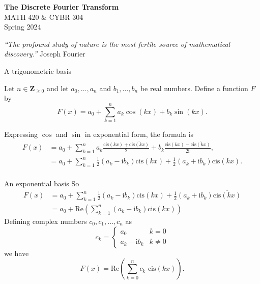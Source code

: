 \documentclass[portrait,fleqn,12pt]{beamer}
\newcommand{\integers}{\mathbf{Z}}
\newcommand{\cis}{\mathrm{cis}}
\newcommand{\imag}{\mathrm{i}}
\newcommand{\re}{\mathrm{Re}}
\begin{document}
\begin{frame}
\begin{flushleft} 
\textbf{The Discrete Fourier Transform} \\
MATH 420 \& CYBR 304 \\
Spring 2024 
\end{flushleft}

\emph{“The profound study of nature is the most fertile source of mathematical discovery.”} \hfill{\sc  Joseph Fourier}

\end{frame}


\begin{frame}{A trigonometric basis}  


Let $n \in \integers_{\geq 0}$ and let $a_0, \dots, a_n$ and $b_1, \dots, b_n$ be real numbers.  Define a function $F$ by 
\begin{equation*}
F(x) = a_0 + \sum_{k=1}^n a_k \cos(k x) +  b_k \sin(k x).
\end{equation*}

Expressing $\cos$ and $\sin$ in exponential form, the formula is 
\begin{align*}
F(x) &= a_0 + \sum_{k=1}^n a_k  \frac{\cis(k x) +  \overline{\cis(k x)}}{2} + b_k  \frac{\cis(k x) -  \overline{\cis(k x)}}{2 \imag}, \\
       & = a_0 + \sum_{k=1}^n \frac{1}{2} (a_k  - \imag b_k) \cis(k x) +   \frac{1}{2} (a_k  + \imag b_k) \overline{\cis(k x) } .  \\
\end{align*}
\end{frame}

\begin{frame}{An exponential basis}
So
\begin{align*}
F(x)   & = a_0 + \sum_{k=1}^n \frac{1}{2} (a_k  - \imag b_k) \cis(k x) +   \frac{1}{2} (a_k  + \imag b_k) \overline{\cis(k x) }   \\
          &= a_0 + \re  \left ( \sum_{k=1}^n (a_k  - \imag b_k) \cis(k x) \right)
\end{align*}
Defining complex numbers $c_0, c_1, \dots, c_n $ as
\begin{equation*}
  c_k = \begin{cases} a_0  & k =0 \\ a_k  - \imag b_k & k \neq 0 \end{cases}
\end{equation*}
we have
\begin{equation*}
F(x)    = \re  \left ( \sum_{k=0}^n c_k \,  \, \cis(k x) \right).
\end{equation*}
\end{frame}
\end{document}
